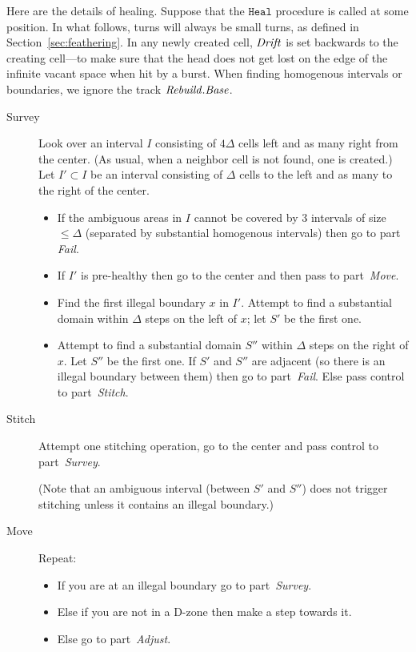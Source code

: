 \documentclass[11pt]{memoir}
\theoremstyle{definition} %
\renewcommand{\le}{\leq}
\newcommand{\fld}[1]{\ensuremath{\textit{#1\/}}}
\newcommand{\rul}[1]{\ensuremath{\texttt{#1}}}
\newcommand{\instr}{\item[]\hspace{-0.6em}}
\newcommand{\Base}{\fld{Base}}
\newcommand{\Drift}{\fld{Drift}}
\newcommand{\Rebuild}{\fld{Rebuild}} %
\newcommand{\rHeal}{\rul{Heal}}
\begin{document}
Here are the details of healing.
Suppose that the \( \rHeal \) procedure is called at some position.
In what follows, turns will always be small turns, as defined in Section~\ref{sec:feathering}. 
In any newly created cell, 
\( \Drift \) is set backwards to the creating cell---to make sure that the head does not get
lost on the edge of the infinite vacant space when hit by a burst.
When finding homogenous intervals or boundaries, we ignore the track
\( \Rebuild.\Base \).

\begin{description}
\item[Survey]
  Look over an interval \( I \) consisting of \( 4\Delta \) cells left and as many right from the center.
  (As usual, when a neighbor cell is not found, one is created.)
  Let \( I'\subset I \) be an interval consisting of \( \Delta \) cells to the left and as
  many to the right of the center.

  \begin{itemize}
    \instr
    If the ambiguous areas in \( I \) cannot be covered by 3 intervals of size \( \le\Delta \) (separated by
    substantial homogenous intervals) then go to part \emph{Fail}.

    \instr If \( I' \) is pre-healthy then go to the center and then pass to part~\emph{Move}.
      
    \instr Find the first illegal boundary \( x \) in \( I' \).
    Attempt to find a substantial domain within \( \Delta \) steps on the left of \( x \);
    let \( S' \) be the first one.

    \instr  Attempt to find a substantial domain \( S'' \) within \( \Delta \) steps on the right of \( x \).
    Let \( S'' \) be the first one.
    If \( S' \) and \( S'' \) are adjacent (so there is an illegal boundary between them) then
    go to part~\emph{Fail}.
    Else pass control to part~\emph{Stitch}.    
    
\end{itemize}

\item[Stitch]
  Attempt one stitching operation, go to the center and pass control
  to part~\emph{Survey}.

  (Note that an ambiguous interval (between \( S' \) and \( S'' \)) does not trigger stitching unless
  it contains an illegal boundary.)

\item[Move]
Repeat:
\begin{itemize}
  \instr If you are at an illegal boundary go to part~\emph{Survey}.
  \instr Else if you are not in a D-zone then make a step towards it.
  \instr Else go to part~\emph{Adjust}.
  \end{itemize}


\end{description}
\end{document}
